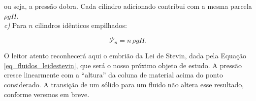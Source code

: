 \begin{exemplo}[Nível II]
\noindent ou seja, a pressão dobra. Cada cilindro adicionado contribui com a mesma parcela $\rho g H$. \\
 
\textit{c)} Para $n$ cilindros idênticos empilhados:
 
\begin{equation}
    \boxed{\mathcal{P}_n = n\,\rho g H.}
    \label{eq:pressao_n_cilindros}
\end{equation}
 
O leitor atento reconhecerá aqui o embrião da Lei de Stevin, dada pela Equação \eqref{eq_fluidos_leidestevin}, que será o nosso próximo objeto de estudo. A pressão cresce linearmente com a
``altura'' da coluna de material acima do ponto considerado. A transição de um sólido para um fluido não
altera esse resultado, conforme veremos em breve.
 
 

\end{exemplo}

\vspace{0.3cm}




